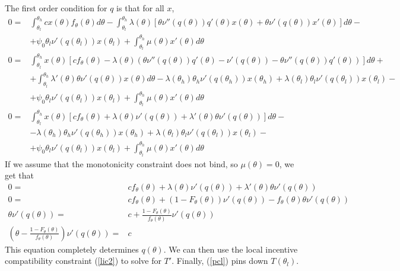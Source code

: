 The first order condition for $q$ is that for all $x$,
\begin{align*}
  0 = & \int_{\theta_l}^{\theta_h} c x(\theta) f_\theta(\theta)
  d\theta - \int_{\theta_l}^{\theta_h} \lambda(\theta)
  \left[ \theta \nu''(q(\theta))q'(\theta) x(\theta) + \theta
    \nu'(q(\theta)) x'(\theta) \right]d\theta - \\
  & + \psi_0 \theta_l
    \nu'(q(\theta_l))x(\theta_l) + \int_{\theta_l}^{\theta_h}
    \mu(\theta) x'(\theta) d\theta \\
  0 = & \int_{\theta_l}^{\theta_h} x(\theta)\left[ c f_\theta(\theta)
        - \lambda(\theta) \left( \theta \nu''(q(\theta))q'(\theta) -
        \nu'(q(\theta)) - \theta \nu''(q(\theta))q'(\theta) \right) \right]
        d\theta + \\
      & + \int_{\theta_l}^{\theta_h} 
        \lambda'(\theta) \theta \nu'(q(\theta)) x(\theta) d\theta 
        - \lambda(\theta_h)\theta_h \nu'(q(\theta_h))x(\theta_h) +
        \lambda(\theta_l)\theta_l \nu'(q(\theta_l))x(\theta_l) - \\
      & + \psi_0 \theta_l \nu'(q(\theta_l))x(\theta_l) 
        + \int_{\theta_l}^{\theta_h} \mu(\theta) x'(\theta) d\theta \\
  0 = & \int_{\theta_l}^{\theta_h} x(\theta)\left[ c f_\theta(\theta)
        + \lambda(\theta) \nu'(q(\theta)) + 
        \lambda'(\theta) \theta \nu'(q(\theta))\right] d\theta  - \\
      & - \lambda(\theta_h)\theta_h \nu'(q(\theta_h))x(\theta_h) +
        \lambda(\theta_l)\theta_l \nu'(q(\theta_l))x(\theta_l) - \\
      & + \psi_0 \theta_l \nu'(q(\theta_l))x(\theta_l) 
        + \int_{\theta_l}^{\theta_h} \mu(\theta) x'(\theta) d\theta 
\end{align*}
If we assume that the monotonicity constraint does not bind, so
$\mu(\theta) = 0$, we get that
\begin{align*}
  0 = &c f_\theta(\theta) + \lambda(\theta) \nu'(q(\theta)) + \lambda'(\theta)
   \theta \nu'(q(\theta))  \\
   0 = & cf_\theta(\theta) + (1-F_\theta(\theta)) \nu'(q(\theta)) -
         f_{\theta}(\theta) \theta \nu'(q(\theta)) \\
  \theta \nu'(q(\theta)) = & c +
                             \frac{1-F_\theta(\theta)}{f_\theta(\theta)} \nu'(q(\theta)) \\
  \left(\theta - \frac{1-F_\theta(\theta)}{f_\theta(\theta)}
  \right)\nu'(q(\theta)) = & c 
\end{align*}
This equation completely determines $q(\theta)$. We can then use the
local incentive compatibility constraint (\ref{lic2}) to solve for
$T'$. Finally, (\ref{pcl}) pins down $T(\theta_l)$.


